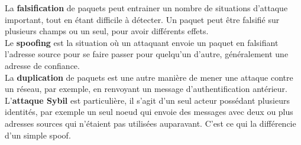 			La \textbf{falsification} de paquets peut entrainer un nombre de situations d'attaque important, tout en étant difficile à détecter. Un paquet peut être falsifié sur plusieurs champs ou un seul, pour avoir différents effets.\\
			Le \textbf{spoofing} est la situation où un attaquant envoie un paquet en falsifiant l'adresse source pour se faire passer pour quelqu'un d'autre, généralement une adresse de confiance.\\
			La \textbf{duplication} de paquets est une autre manière de mener une attaque contre un réseau, par exemple, en renvoyant un message d'authentification antérieur.\\
			L'\textbf{attaque Sybil} est particulière, il s'agit d'un seul acteur possédant plusieurs identités, par exemple un seul noeud qui envoie des messages avec deux ou plus adresses sources qui n'étaient pas utilisées auparavant. C'est ce qui la différencie d'un simple spoof.


